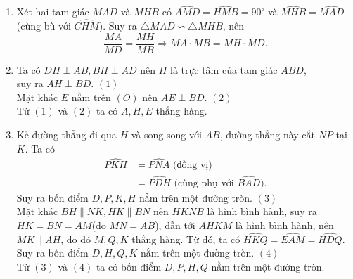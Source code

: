 \begin{ex}
{\begin{enumerate}
		Ta có $\widehat{ACH}=\widehat{AMH}=90^ \circ$, suy ra bốn điểm $A,C,H,M$ cùng nằm trên đường tròn đường kính $AH$, tâm là trung điểm $AH$.
		\item 
		Xét hai tam giác $MAD$ và $MHB$ có $\widehat{AMD}=\widehat{HMB}=90^ \circ$ và $\widehat{MHB}=\widehat{MAD}$(cùng bù với $\widehat{CHM}$). Suy ra $\triangle MAD \backsim \triangle MHB$, nên 
		$$\dfrac{MA}{MD}=\dfrac{MH}{MB}\Rightarrow MA \cdot MB = MH \cdot MD.$$
		\item 
		Ta có $DH \perp AB, BH \perp AD$ nên $H$ là trực tâm của tam giác $ABD$,\\ suy ra $AH \perp BD$. \hfill $(1)$\\
		Mặt khác $E$ nằm trên $(O)$ nên $AE  \perp BD.$ \hfill $(2)$\\
		Từ $(1)$ và $(2)$ ta có $A,H,E$ thẳng hàng.
		\item 
		Kẻ đường thẳng đi qua $H$ và song song với $AB$, đường thẳng này cắt $NP$ tại $K$. Ta có 
		\begin{align*}
		\widehat{PKH} &=\widehat{PNA} \text{ (đồng vị)}\\
		&=\widehat{PDH} \text{ (cùng phụ với $\widehat{BAD}$).}
		\end{align*}
	Suy ra bốn điểm $D,P,K,H$ nằm trên một đường tròn. \hfill $(3)$\\
	Mặt khác $BH \parallel NK, HK \parallel BN$ nên $HKNB$ là hình bình hành, suy ra $HK=BN=AM$(do $MN=AB$), dẫn tới $AHKM$ là hình bình hành, nên $MK \parallel AH$, do đó $M,Q,K$ thẳng hàng. Từ đó, ta có $\widehat{HKQ}=\widehat{EAM}=\widehat{HDQ}$. Suy ra bốn điểm $D,H,Q,K$ nằm trên một đường tròn. \hfill $(4)$\\
	Từ $(3)$ và $(4)$ ta có bốn điểm $D,P,H,Q$ nằm trên một đường tròn.
	\end{enumerate} 	
}
\end{ex}
